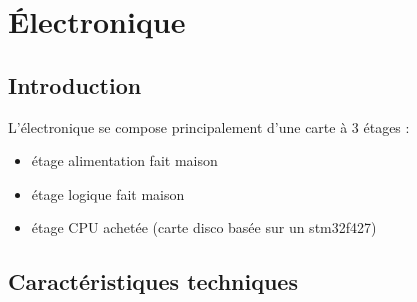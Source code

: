 \chapter{Électronique}

\section{Introduction}

L'électronique se compose principalement d'une carte à 3 étages :
\begin{itemize}
	\item étage alimentation fait maison
	\item étage logique fait maison
	\item étage CPU achetée (carte disco basée sur un stm32f427)
\end{itemize}

\section{Caractéristiques techniques}
